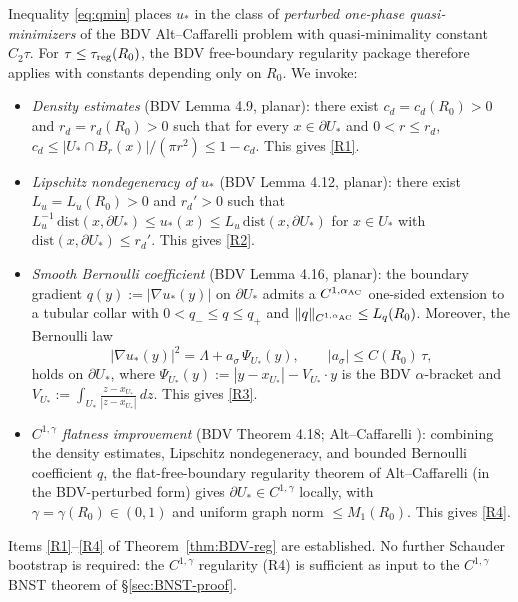 \documentclass[11pt]{amsart}
\begin{document}
Inequality \eqref{eq:qmin} places \(u_*\) in the class of
\emph{perturbed one-phase quasi-minimizers} of the BDV Alt--Caffarelli
problem with quasi-minimality constant \(C_2\tau\).  For
\(\tau\le\tau_{\rm reg}(R_0)\), the BDV free-boundary regularity
package therefore applies with constants depending only on \(R_0\).
We invoke:

\begin{itemize}
\item \emph{Density estimates} (BDV Lemma 4.9, planar):
there exist \(c_d=c_d(R_0)>0\) and \(r_d=r_d(R_0)>0\) such that for
every \(x\in\partial U_*\) and \(0<r\le r_d\),
\(c_d\le|U_*\cap B_r(x)|/(\pi r^{2})\le 1-c_d\).  This gives
\ref{R1}.
\item \emph{Lipschitz nondegeneracy of \(u_*\)} (BDV Lemma 4.12,
planar): there exist \(L_u=L_u(R_0)>0\) and \(r_d'>0\) such that
\(L_u^{-1}\,\mathrm{dist}(x,\partial U_*)\le u_*(x)\le L_u\,
\mathrm{dist}(x,\partial U_*)\) for \(x\in U_*\) with
\(\mathrm{dist}(x,\partial U_*)\le r_d'\).  This gives \ref{R2}.
\item \emph{Smooth Bernoulli coefficient} (BDV Lemma 4.16,
planar): the boundary gradient
\(q(y):=|\nabla u_*(y)|\) on \(\partial U_*\) admits a
\(C^{1,\alpha_{\rm AC}}\) one-sided extension to a tubular collar
with \(0<q_-\le q\le q_+\) and
\(\|q\|_{C^{1,\alpha_{\rm AC}}}\le L_q(R_0)\).  Moreover, the
Bernoulli law
\begin{equation}\label{eq:Bern-raw}
   |\nabla u_*(y)|^{2}=\Lambda+a_\sigma\,\Psi_{U_*}(y),
   \qquad
   |a_\sigma|\le C(R_0)\,\tau,
\end{equation}
holds on \(\partial U_*\), where
\(\Psi_{U_*}(y):=|y-x_{U_*}|-V_{U_*}\cdot y\) is the BDV
\(\alpha\)-bracket and \(V_{U_*}:=\int_{U_*}\frac{z-x_{U_*}}{|z-x_{U_*}|}\,dz\).
This gives \ref{R3}.
\item \emph{\(C^{1,\gamma}\) flatness improvement} (BDV
Theorem 4.18; Alt--Caffarelli \cite{AC}): combining the density
estimates, Lipschitz nondegeneracy, and bounded Bernoulli coefficient
\(q\), the flat-free-boundary regularity theorem of Alt--Caffarelli
(in the BDV-perturbed form) gives \(\partial U_*\in C^{1,\gamma}\)
locally, with \(\gamma=\gamma(R_0)\in(0,1)\) and uniform graph norm
\(\le M_{1}(R_0)\).  This gives \ref{R4}.
\end{itemize}

Items \ref{R1}--\ref{R4} of Theorem~\ref{thm:BDV-reg} are
established.  No further Schauder bootstrap is required: the
$C^{1,\gamma}$ regularity (R4) is sufficient as input to the
$C^{1,\gamma}$ BNST theorem of \S\ref{sec:BNST-proof}.
\end{document}
